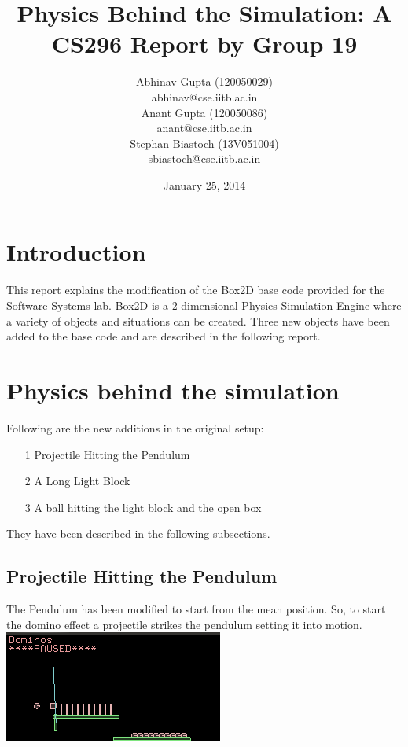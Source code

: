 \documentclass[11pt]{article}
\title{Physics Behind the Simulation: A CS296 Report by Group 19}
\author{Abhinav Gupta (120050029) \\ abhinav@cse.iitb.ac.in \\ Anant Gupta (120050086) \\anant@cse.iitb.ac.in\\ Stephan Biastoch (13V051004)\\sbiastoch@cse.iitb.ac.in}
\date{January 25, 2014}
\begin{document}
\maketitle

\section{Introduction}
This report explains the modification of the Box2D base code provided for the Software Systems lab. Box2D is a 2 dimensional Physics Simulation Engine where a variety of objects and situations can be created. Three new objects have been added to the base code and are described in the following report.
\pagebreak

\section{Physics behind the simulation}

Following are the new additions in the original setup:
\begin{itemize}
\item[1] Projectile Hitting the Pendulum
\item[2] A Long Light Block
\item[3] A ball hitting the light block and the open box
\end{itemize}

They have been described in the following subsections.

\pagebreak

\subsection{Projectile Hitting the Pendulum}


The Pendulum has been modified to start from the mean position. So, to start the domino effect a projectile strikes the pendulum setting it into motion.\\

\includegraphics[scale=0.7,natwidth=272,natheight=138]{11.png}
\end{document}
